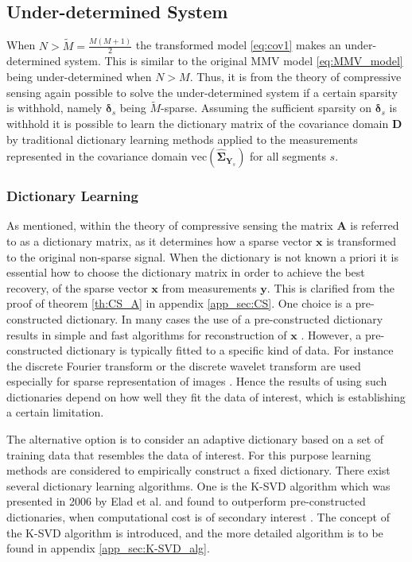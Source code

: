 \subsection{Under-determined System}\label{sec:cov1}
When $N > \widetilde{M} = \frac{M(M+1)}{2}$ the transformed model \eqref{eq:cov1} makes an under-determined system.   
This is similar to the original MMV model \eqref{eq:MMV_model} being under-determined  when $N > M$. 
Thus, it is from the theory of compressive sensing again possible to solve the under-determined system if a certain sparsity is withhold, namely $\boldsymbol{\delta}_s$ being $\widetilde{M}$-sparse.
Assuming the sufficient sparsity on $\boldsymbol{\delta}_s$ is withhold it is possible to learn the dictionary matrix of the covariance domain $\mathbf{D}$ by traditional dictionary learning methods applied to the measurements represented in the covariance domain $\text{vec}\left(\widehat{\boldsymbol{\Sigma}}_{\mathbf{Y}_s}\right)$ for all segments $s$.

\subsubsection{Dictionary Learning}\label{sec:dictionarylearning}
As mentioned, within the theory of compressive sensing the matrix $\mathbf{A}$ is referred to as a dictionary matrix, as it determines how a sparse vector $\mathbf{x}$ is transformed to the original non-sparse signal. 
When the dictionary is not known a priori it is essential how to choose the dictionary matrix in order to achieve the best recovery, of the sparse vector $\mathbf{x}$ from measurements $\mathbf{y}$. 
This is clarified from the proof of theorem \ref{th:CS_A} in appendix \ref{app_sec:CS}. 
One choice is a pre-constructed dictionary. 
In many cases the use of a pre-constructed dictionary results in simple and fast algorithms for reconstruction of $\mathbf{x}$ \cite{Elad_book}. 
However, a pre-constructed dictionary is typically fitted to a specific kind of data. 
For instance the discrete Fourier transform or the discrete wavelet transform are used especially for sparse representation of images \cite{Elad_book}. 
Hence the results of using such dictionaries depend on how well they fit the data of interest, which is establishing a certain limitation. 

The alternative option is to consider an adaptive dictionary based on a set of training data that resembles the data of interest. 
For this purpose learning methods are considered to empirically construct a fixed dictionary. 
There exist several dictionary learning algorithms. One is the K-SVD algorithm which was presented in 2006 by Elad et al. and found to outperform pre-constructed dictionaries, when computational cost is of secondary interest \cite{Elad2006}. 
The concept of the K-SVD algorithm is introduced, and the more detailed algorithm is to be found in appendix \ref{app_sec:K-SVD_alg}. 

